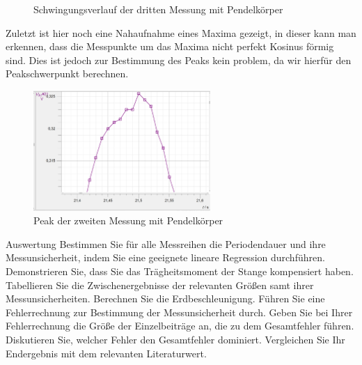 \documentclass[twoside]{protokoll}
\begin{document}
\begin{figure}[H]
    \centering
    \hfill
    \caption{Schwingungsverlauf der dritten Messung mit Pendelkörper}
    \end{figure}

Zuletzt ist hier noch eine Nahaufnahme eines Maxima gezeigt, in dieser kann man erkennen, dass die Messpunkte um das Maxima nicht perfekt Kosinus förmig sind.
Dies ist jedoch zur Bestimmung des Peaks kein problem, da wir hierfür den Peakschwerpunkt berechnen.

\begin{figure}[H]
    \centering
    \includegraphics[width=0.6\textwidth]{plots/gewicht-2-peak.pdf}
    \caption{Peak der zweiten Messung mit Pendelkörper}
    \end{figure}
     
     
\begin{aufgabe}{Auswertung}
  Bestimmen Sie für alle Messreihen die Periodendauer und ihre
  Messunsicherheit, indem Sie eine geeignete lineare Regression
  durchführen. Demonstrieren Sie, dass Sie das Trägheitsmoment der
  Stange kompensiert haben. Tabellieren Sie die Zwischenergebnisse
  der relevanten Größen samt ihrer Messunsicherheiten. Berechnen
  Sie die Erdbeschleunigung. Führen Sie eine Fehlerrechnung zur
  Bestimmung der Messunsicherheit durch. Geben Sie bei Ihrer
  Fehlerrechnung die Größe der Einzelbeiträge an, die zu dem
  Gesamtfehler führen. Diskutieren Sie, welcher Fehler den
  Gesamtfehler dominiert. Vergleichen Sie Ihr Endergebnis mit dem
  relevanten Literaturwert.
\end{aufgabe}
\end{document}
